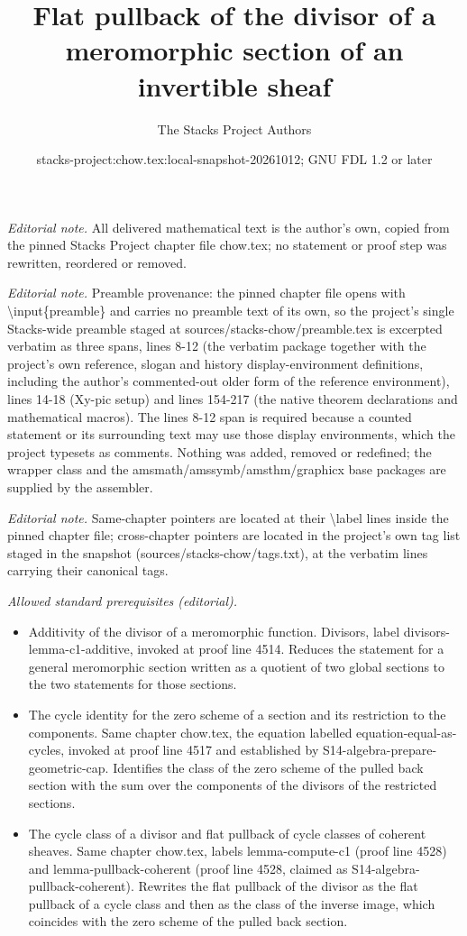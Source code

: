 \documentclass[10pt,a4paper]{amsart}
\title{Flat pullback of the divisor of a meromorphic section of an invertible sheaf}
\author{The Stacks Project Authors}
\date{stacks-project:chow.tex:local-snapshot-20261012; GNU FDL 1.2 or later}
\theoremstyle{plain}
\theoremstyle{definition}
\theoremstyle{remark}
\numberwithin{equation}{subsection}
\begin{document}
\maketitle
\noindent\textit{Editorial note.} All delivered mathematical text is the author's own, copied from the pinned Stacks Project chapter file chow.tex; no statement or proof step was rewritten, reordered or removed.\par\medskip
\noindent\textit{Editorial note.} Preamble provenance: the pinned chapter file opens with \textbackslash{}input\{preamble\} and carries no preamble text of its own, so the project's single Stacks-wide preamble staged at sources/stacks-chow/preamble.tex is excerpted verbatim as three spans, lines 8-12 (the verbatim package together with the project's own reference, slogan and history display-environment definitions, including the author's commented-out older form of the reference environment), lines 14-18 (Xy-pic setup) and lines 154-217 (the native theorem declarations and mathematical macros). The lines 8-12 span is required because a counted statement or its surrounding text may use those display environments, which the project typesets as comments. Nothing was added, removed or redefined; the wrapper class and the amsmath/amssymb/amsthm/graphicx base packages are supplied by the assembler.\par\medskip
\noindent\textit{Editorial note.} Same-chapter pointers are located at their \textbackslash{}label lines inside the pinned chapter file; cross-chapter pointers are located in the project's own tag list staged in the snapshot (sources/stacks-chow/tags.txt), at the verbatim lines carrying their canonical tags.\par\medskip
\noindent\textit{Allowed standard prerequisites (editorial).}\begin{itemize}
\item Additivity of the divisor of a meromorphic function. Divisors, label divisors-lemma-c1-additive, invoked at proof line 4514. Reduces the statement for a general meromorphic section written as a quotient of two global sections to the two statements for those sections.
\item The cycle identity for the zero scheme of a section and its restriction to the components. Same chapter chow.tex, the equation labelled equation-equal-as-cycles, invoked at proof line 4517 and established by S14-algebra-prepare-geometric-cap. Identifies the class of the zero scheme of the pulled back section with the sum over the components of the divisors of the restricted sections.
\item The cycle class of a divisor and flat pullback of cycle classes of coherent sheaves. Same chapter chow.tex, labels lemma-compute-c1 (proof line 4528) and lemma-pullback-coherent (proof line 4528, claimed as S14-algebra-pullback-coherent). Rewrites the flat pullback of the divisor as the flat pullback of a cycle class and then as the class of the inverse image, which coincides with the zero scheme of the pulled back section.
\end{itemize}\medskip
\end{document}
